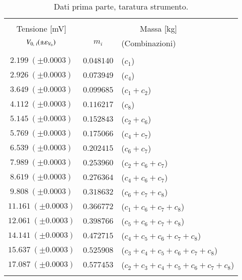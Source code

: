 \begin{table}
    \footnotesize
    \centering
    \caption{Dati prima parte, taratura strumento.}
    \label{table:p1}
    \begin{tabular}{ccl}
        \hline\hline\\[-1.5ex]
        Tensione [mV]       & \multicolumn{2}{c}{Massa [kg]}                         \\[+0.5ex]
        $V_{0,~i}(\pm\varepsilon_{V_0})$ & $m_i$      &  (Combinazioni)                  \\[+0.5ex] \hline \\[-1.5ex]
        $ 2.199~(\pm0.0003)$         & $0.048140$ &  ($c_1$)                         \\[+0.5ex]
        $ 2.926~(\pm0.0003)$         & $0.073949$ &  ($c_4$)                         \\[+0.5ex]
        $ 3.649~(\pm0.0003)$         & $0.099685$ &  ($c_1+c_2$)                     \\[+0.5ex]
        $ 4.112~(\pm0.0003)$         & $0.116217$ &  ($c_8$)                         \\[+0.5ex]
        $ 5.145~(\pm0.0003)$         & $0.152843$ &  ($c_2+c_6$)                     \\[+0.5ex]
        $ 5.769~(\pm0.0003)$         & $0.175066$ &  ($c_4+c_7$)                     \\[+0.5ex]
        $ 6.539~(\pm0.0003)$         & $0.202415$ &  ($c_6+c_7$)                     \\[+0.5ex]
        $ 7.989~(\pm0.0003)$         & $0.253960$ &  ($c_2+c_6+c_7$)                 \\[+0.5ex]
        $ 8.619~(\pm0.0003)$         & $0.276364$ &  ($c_4+c_6+c_7$)                 \\[+0.5ex]
        $ 9.808~(\pm0.0003)$         & $0.318632$ &  ($c_6+c_7+c_8$)                 \\[+0.5ex]
        $11.161~(\pm0.0003)$         & $0.366772$ &  ($c_1+c_6+c_7+c_8$)             \\[+0.5ex]
        $12.061~(\pm0.0003)$         & $0.398766$ &  ($c_5+c_6+c_7+c_8$)             \\[+0.5ex]
        $14.141~(\pm0.0003)$         & $0.472715$ &  ($c_4+c_5+c_6+c_7+c_8$)         \\[+0.5ex]
        $15.637~(\pm0.0003)$         & $0.525908$ &  ($c_3+c_4+c_5+c_6+c_7+c_8$)     \\[+0.5ex]
        $17.087~(\pm0.0003)$         & $0.577453$ &  ($c_2+c_3+c_4+c_5+c_6+c_7+c_8$) \\[+0.5ex] \hline \\[-1.5ex]
    \end{tabular}
\end{table}